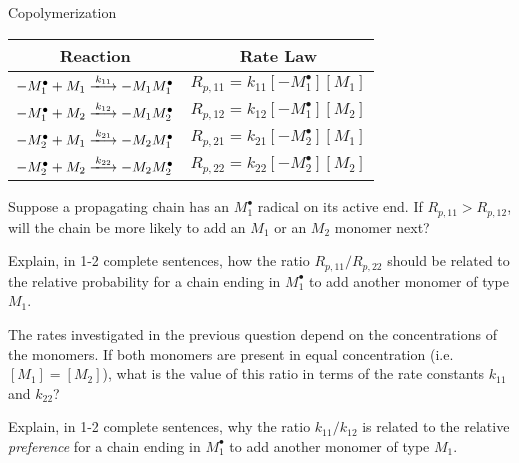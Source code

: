 \begin{activity}{Copolymerization}
\begin{model}
	\begin{center}
		\renewcommand{\arraystretch}{1.8}
		\begin{tabular}{|c|c|}
			\hline
			\textbf{Reaction} & \textbf{Rate Law} \\\hline
			$-M_1^\bullet + M_1 \xlongrightarrow{k_{11}} -M_1M_1^\bullet$ & $R_{p,11} = k_{11}[-M_1^\bullet][M_1]$ \\\hline
			$-M_1^\bullet + M_2 \xlongrightarrow{k_{12}} -M_1M_2^\bullet$ & $R_{p,12} = k_{12}[-M_1^\bullet][M_2]$ \\\hline
			$-M_2^\bullet + M_1 \xlongrightarrow{k_{21}} -M_2M_1^\bullet$ & $R_{p,21} = k_{21}[-M_2^\bullet][M_1]$ \\\hline
			$-M_2^\bullet + M_2 \xlongrightarrow{k_{22}} -M_2M_2^\bullet$ & $R_{p,22} = k_{22}[-M_2^\bullet][M_2]$ \\\hline
		\end{tabular}
	\end{center}

\end{model}

\begin{ctqs}

	\question Suppose a propagating chain has an $M_1^\bullet$ radical on its active end.  If $R_{p,11}>R_{p,12}$, will the chain be more likely to add an $M_1$ or an $M_2$ monomer next?
	
		\begin{solution}[0.5in]
		\end{solution}
	
	\question Explain, in 1-2 complete sentences, how the ratio $R_{p,11}/R_{p,22}$ should be related to the relative probability for a chain ending in $M_1^\bullet$ to add another monomer of type $M_1$.
	
		\begin{solution}[1in]
		\end{solution}
	
	\question The rates investigated in the previous question depend on the concentrations of the monomers.  If both monomers are present in equal concentration (i.e. $[M_1]=[M_2]$), what is the value of this ratio in terms of the rate constants $k_{11}$ and $k_{22}$?
	
		\begin{solution}[1in]
		\end{solution}
	
	\question Explain, in 1-2 complete sentences, why the ratio $k_{11}/k_{12}$ is related to the relative \emph{preference} for a chain ending in $M_1^\bullet$ to add another monomer of type $M_1$.
	

\end{ctqs}
\end{activity}
